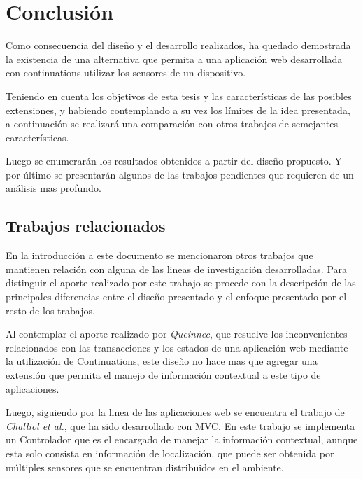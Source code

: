 
\chapter{Conclusión}
\label{Capitulo 7}

Como consecuencia del diseño y el desarrollo realizados, ha quedado demostrada la existencia de una alternativa que permita a una aplicación web desarrollada con continuations utilizar los sensores de un dispositivo.

Teniendo en cuenta los objetivos de esta tesis y las características de las posibles extensiones, y habiendo contemplando a su vez los límites de la idea presentada, a continuación se realizará una comparación con otros trabajos de semejantes características.

Luego se enumerarán los resultados obtenidos a partir del diseño propuesto. Y por último se presentarán algunos de las trabajos pendientes que requieren de un análisis mas profundo.


\section{Trabajos relacionados}
\label{Trabajos Relacionados}

En la introducción a este documento se mencionaron otros trabajos que mantienen relación con alguna de las lineas de investigación desarrolladas. Para distinguir el aporte realizado por este trabajo se procede con la descripción de las principales diferencias entre el diseño presentado y el enfoque presentado por el resto de los trabajos.

Al contemplar el aporte realizado por \emph{Queinnec}\cite{Queinnec01}, que resuelve los inconvenientes relacionados con las transacciones y los estados de una aplicación web mediante la utilización de Continuations, este diseño no hace mas que agregar una extensión que permita el manejo de información contextual a este tipo de aplicaciones.

Luego, siguiendo por la linea de las aplicaciones web se encuentra el trabajo de \emph{Challiol et al.}\cite{Challiol06}, que ha sido desarrollado con MVC. En este trabajo se implementa un Controlador que es el encargado de manejar la información contextual, aunque esta solo consista en información de localización, que puede ser obtenida por múltiples sensores que se encuentran distribuidos en el ambiente.

